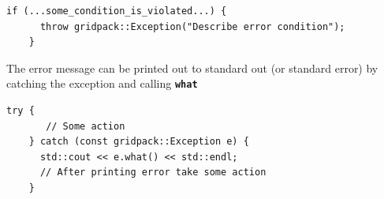 {
\color{red}
\begin{Verbatim}[fontseries=b]
    if (...some_condition_is_violated...) {
      throw gridpack::Exception("Describe error condition");
    }
\end{Verbatim}
}

The error message can be printed out to standard out (or standard error) by catching the exception and calling \texttt{\textbf{what}}

{
\color{red}
\begin{Verbatim}[fontseries=b]
    try {
       // Some action
    } catch (const gridpack::Exception e) {
      std::cout << e.what() << std::endl;
      // After printing error take some action
    }
\end{Verbatim}
}
\hyperlink{topDoc}{\color{blue}{Top}}
